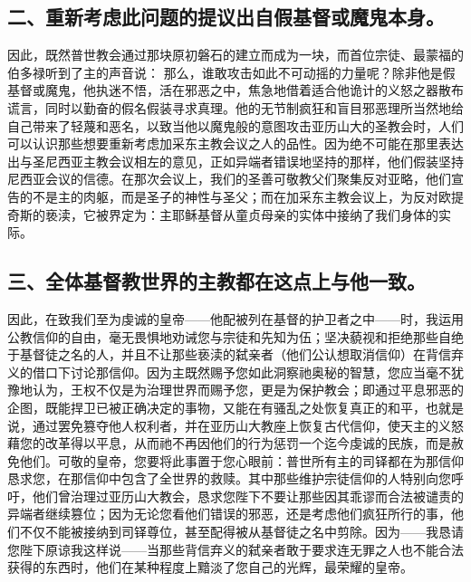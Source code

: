 
\subsection{二、重新考虑此问题的提议出自假基督或魔鬼本身。}

因此，既然普世教会通过那块原初磐石的建立而成为一块，而首位宗徒、最蒙福的伯多禄听到了主的声音说： 那么，谁敢攻击如此不可动摇的力量呢？除非他是假基督或魔鬼，他执迷不悟，活在邪恶之中，焦急地借着适合他诡计的义怒之器散布谎言，同时以勤奋的假名假装寻求真理。他的无节制疯狂和盲目邪恶理所当然地给自己带来了轻蔑和恶名，以致当他以魔鬼般的意图攻击亚历山大的圣教会时，人们可以认识那些想要重新考虑加采东主教会议之人的品性。因为绝不可能在那里表达出与圣尼西亚主教会议相左的意见，正如异端者错误地坚持的那样，他们假装坚持尼西亚会议的信德。在那次会议上，我们的圣善可敬教父们聚集反对亚略，他们宣告的不是主的肉躯，而是圣子的神性与圣父；而在加采东主教会议上，为反对欧提奇斯的亵渎，它被界定为：主耶稣基督从童贞母亲的实体中接纳了我们身体的实际。\par


\subsection{三、全体基督教世界的主教都在这点上与他一致。}

因此，在致我们至为虔诚的皇帝——他配被列在基督的护卫者之中——时，我运用公教信仰的自由，毫无畏惧地劝诫您与宗徒和先知为伍；坚决藐视和拒绝那些自绝于基督徒之名的人，并且不让那些亵渎的弑亲者（他们公认想取消信仰）在背信弃义的借口下讨论那信仰。因为主既然赐予您如此洞察祂奥秘的智慧，您应当毫不犹豫地认为，王权不仅是为治理世界而赐予您，更是为保护教会；即通过平息邪恶的企图，既能捍卫已被正确决定的事物，又能在有骚乱之处恢复真正的和平，也就是说，通过罢免篡夺他人权利者，并在亚历山大教座上恢复古代信仰，使天主的义怒藉您的改革得以平息，从而祂不再因他们的行为惩罚一个迄今虔诚的民族，而是赦免他们。可敬的皇帝，您要将此事置于您心眼前：普世所有主的司铎都在为那信仰恳求您，在那信仰中包含了全世界的救赎。其中那些维护宗徒信仰的人特别向您呼吁，他们曾治理过亚历山大教会，恳求您陛下不要让那些因其乖谬而合法被谴责的异端者继续篡位；因为无论您看他们错误的邪恶，还是考虑他们疯狂所行的事，他们不仅不能被接纳到司铎尊位，甚至配得被从基督徒之名中剪除。因为——我恳请您陛下原谅我这样说——当那些背信弃义的弑亲者敢于要求连无罪之人也不能合法获得的东西时，他们在某种程度上黯淡了您自己的光辉，最荣耀的皇帝。\par

